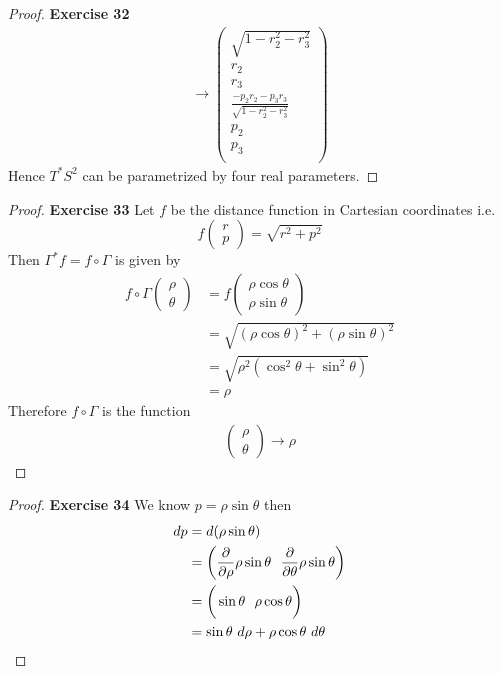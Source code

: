 \documentclass[11pt]{article}
\theoremstyle{definition}
\begin{document}
\begin{proof}{\textbf{Exercise 32}}
\begin{align*}
        \to
        \begin{pmatrix}
            \sqrt{1 -r_2^2 - r_3^2}\\[6pt] r_2\\[6pt] r_3\\[6pt]
            \frac{-p_2r_2 - p_3r_3}{\sqrt{1 -r_2^2 - r_3^2}}\\[6pt]
            p_2\\[6pt] p_3\\[6pt]
        \end{pmatrix}
    \end{align*}
    Hence $T^*S^2$ can be parametrized by four real parameters.
\end{proof}

\cleardoublepage
\begin{proof}{\textbf{Exercise 33}}
Let $f$ be the distance function in Cartesian coordinates i.e.
$$f\begin{pmatrix}r \\ p\end{pmatrix} = \sqrt{r^2 + p^2}$$
Then $\Gamma^* f = f \circ \Gamma$ is given by
\begin{align*}
    f \circ \Gamma\begin{pmatrix}\rho \\ \theta \end{pmatrix}
    &= f\begin{pmatrix}
        \rho\cos\theta \\  \rho\sin\theta
    \end{pmatrix}\\
    &= \sqrt{(\rho\cos\theta)^2 + (\rho\sin\theta)^2}\\
    &= \sqrt{\rho^2(\cos^2\theta + \sin^2\theta)}\\
    &= \rho
\end{align*}
Therefore $f\circ \Gamma$ is the function
\begin{align*}
    \begin{pmatrix}\rho \\ \theta \end{pmatrix} \to \rho
\end{align*}
\end{proof}
\begin{proof}{\textbf{Exercise 34}} We know $p = \rho\sin\theta$ then
\begin{align*}
    dp &= d(\rho \sin\theta)\\
    &= \bigg(\pdv{\rho}\rho \sin\theta~~\pdv{\theta}\rho \sin\theta\bigg)\\
    &= \bigg(\sin\theta~~\rho \cos\theta\bigg)\\
    &= \sin\theta~d\rho + \rho \cos\theta~d\theta
\end{align*}
\end{proof}
\end{document}
